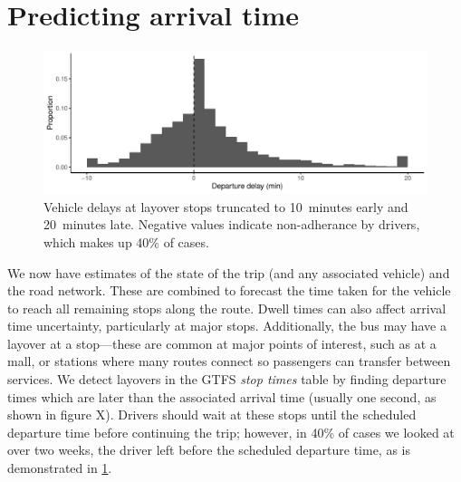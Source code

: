 \section{Predicting arrival time}
\label{sec:prediction_arrival_time}




\begin{knitrout}
\color{fgcolor}\begin{figure}

{\centering \includegraphics[width=\linewidth]{figure/layover_observance-1} 

}

\caption[Vehicle delays at layover stops truncated to 10~minutes early and 20~minutes late]{Vehicle delays at layover stops truncated to 10~minutes early and 20~minutes late. Negative values indicate non-adherance by drivers, which makes up 40\% of cases.}\label{fig:layover_observance}
\end{figure}


\end{knitrout}

We now have estimates of the state of the trip (and any associated vehicle) and the road network. These are combined to forecast the time taken for the vehicle to reach all remaining stops along the route. Dwell times can also affect arrival time uncertainty, particularly at major stops. Additionally, the bus may have a layover at a stop---these are common at major points of interest, such as at a mall, or stations where many routes connect so passengers can transfer between services. We detect layovers in the GTFS \emph{stop times} table by finding departure times which are later than the associated arrival time (usually one second, as shown in figure X). Drivers should wait at these stops until the scheduled departure time before continuing the trip; however, in 40\% of cases we looked at over two weeks, the driver left before the scheduled departure time, as is demonstrated in \cref{fig:layover_observance}.

